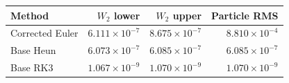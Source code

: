 \begin{tabular}{@{}lrrr@{}}
\toprule
Method & $W_2$ lower & $W_2$ upper & Particle RMS\\
\midrule
Corrected Euler & $6.111\times10^{-7}$ & $8.675\times10^{-7}$ & $8.810\times10^{-4}$\\
Base Heun & $6.073\times10^{-7}$ & $6.085\times10^{-7}$ & $6.085\times10^{-7}$\\
Base RK3 & $1.067\times10^{-9}$ & $1.070\times10^{-9}$ & $1.070\times10^{-9}$\\
\bottomrule
\end{tabular}
